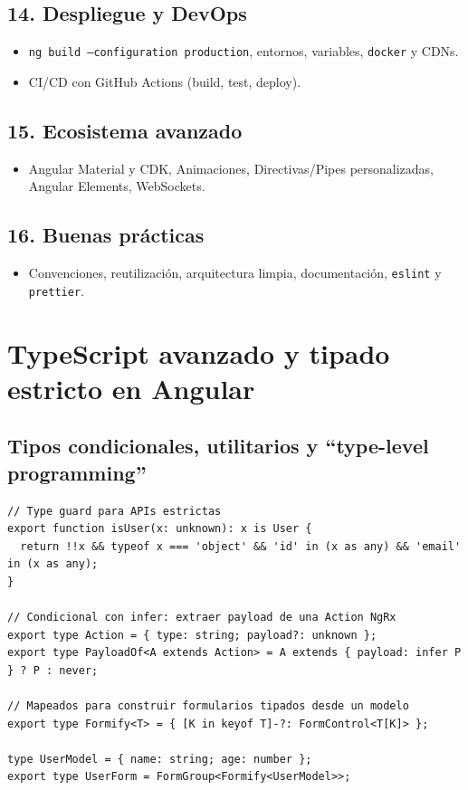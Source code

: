 \documentclass[11pt,a4paper]{article}
\begin{document}
\subsection{14. Despliegue y DevOps}
\begin{itemize}[leftmargin=*]
  \item \texttt{ng build --configuration production}, entornos, variables, \texttt{docker} y CDNs.
  \item CI/CD con GitHub Actions (build, test, deploy).
\end{itemize}

\subsection{15. Ecosistema avanzado}
\begin{itemize}[leftmargin=*]
  \item Angular Material y CDK, Animaciones, Directivas/Pipes personalizadas, Angular Elements, WebSockets.
\end{itemize}

\subsection{16. Buenas prácticas}
\begin{itemize}[leftmargin=*]
  \item Convenciones, reutilización, arquitectura limpia, documentación, \texttt{eslint} y \texttt{prettier}.
\end{itemize}

\section{TypeScript avanzado y tipado estricto en Angular}
\subsection{Tipos condicionales, utilitarios y ``type-level programming''}
\begin{lstlisting}[style=tsstyle, caption={Condicionales, infer y mapeados útiles}]
// Type guard para APIs estrictas
export function isUser(x: unknown): x is User {
  return !!x && typeof x === 'object' && 'id' in (x as any) && 'email' in (x as any);
}

// Condicional con infer: extraer payload de una Action NgRx
export type Action = { type: string; payload?: unknown };
export type PayloadOf<A extends Action> = A extends { payload: infer P } ? P : never;

// Mapeados para construir formularios tipados desde un modelo
export type Formify<T> = { [K in keyof T]-?: FormControl<T[K]> };

type UserModel = { name: string; age: number };
export type UserForm = FormGroup<Formify<UserModel>>;
\end{lstlisting}
\end{document}
